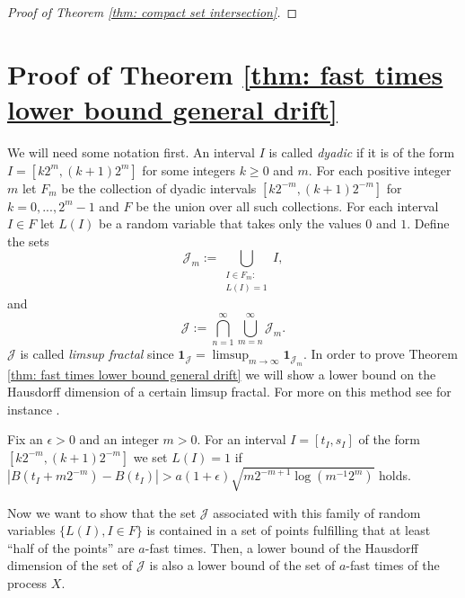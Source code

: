 \documentclass[11pt, reqno]{amsart}
\theoremstyle{plain}
\theoremstyle{definition}
\theoremstyle{remark}
\begin{document}
\begin{proof}[Proof of Theorem \ref{thm: compact set intersection}]
\end{proof}

\section{Proof of Theorem \ref{thm: fast times lower bound general drift}} \label{section lower bound general continuous functions without intersection}

We will need some notation first. An interval $I$ is called \textit{dyadic} if it is of the form $I=[k2^{m},(k+1)2^m]$ for some integers $k\geq 0$ and $m$.
For each positive integer $m$ let $F_m$  be the collection of dyadic intervals $[k2^{-m},(k+1)2^{-m}]$ for $k = 0, . . . , 2^m-1$ and $F$ be the union over all such collections.
For each interval $I\in F$ let $L(I)$ be a random variable that takes only the values $0$ and $1$. Define the sets 
$${\mathcal{J}}_m := \bigcup_{\substack{I\in F_m: \\L(I)=1}} I,$$ and 
$${\mathcal{J}}:=\bigcap_{n=1}^{\infty}\bigcup_{m=n}^{\infty} {\mathcal{J}}_m.$$
${\mathcal{J}}$ is called \textit{limsup fractal} since ${\mathbf{1}}_{\mathcal{J}}=\limsup_{m\rightarrow\infty} {\mathbf{1}}_{{\mathcal{J}}_m}$.
In order to prove Theorem \ref{thm: fast times lower bound general drift} we will show a lower bound on the Hausdorff dimension of a certain limsup fractal. For more on this method see for instance \cite{MP}.

Fix an $\epsilon >0$ and an integer $m> 0$. For an interval $I=[t_I,s_I]$ of the form $[k2^{-m},(k+1)2^{-m}]$ we set $L(I) =1$ if $|{B}(t_I+m2^{-m}) - {B}(t_I)| > a(1+\epsilon)\sqrt{m2^{-m+1}\log(m^{-1}2^m)}$ holds.

Now we want to show that the set ${\mathcal{J}}$ associated with this family of random variables $\{L(I), I\in F\}$ is contained in a set of points fulfilling that at least ``half of the points'' are $a$-fast times. Then, a lower bound of the Hausdorff dimension of the set of ${\mathcal{J}}$ is also a lower bound of the set of $a$-fast times of the process $X$.
\end{document}

